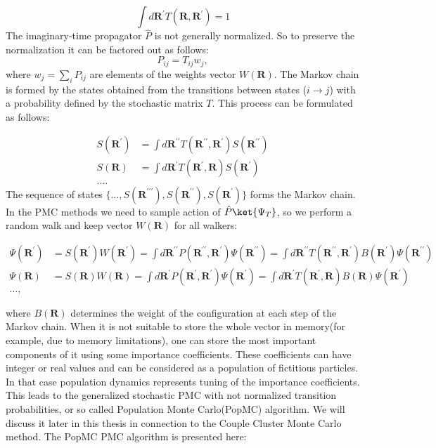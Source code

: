 \documentclass[twoside,english]{uiofysmaster}
\begin{document}
\begin{equation}
\int d\boldsymbol{R}^\prime T(\boldsymbol{R}, \boldsymbol{R}^\prime) = 1
\end{equation}
The imaginary-time propagator $\hat{P}$ is not generally normalized. So to preserve the normalization it can be factored out as follows:
\begin{equation}
P_{ij} = T_{ij}w_j,
\end{equation}
where $w_j = \sum_i P_{ij}$ are elements of the weights vector $W(\boldsymbol{R})$.
The Markov chain is formed by the states obtained from the transitions between states ($i \rightarrow j$) with a probability defined by the stochastic matrix $T$. This process can be formulated as follows:

\begin{align*}
S(\boldsymbol{R}^\prime)  &= \int d\boldsymbol{R}^{\prime\prime} T(\boldsymbol{R^{\prime\prime}}, \boldsymbol{R}^\prime) S(\boldsymbol{R}^{\prime\prime})\\
S(\boldsymbol{R}) &= \int d\boldsymbol{R}^\prime T(\boldsymbol{R^\prime}, \boldsymbol{R}) S(\boldsymbol{R}^{\prime})\\
\dots.
\end{align*}
The sequence of states $\{\dots ,S(\boldsymbol{R}^{\prime\prime\prime}) ,S(\boldsymbol{R}^{\prime\prime}), S(\boldsymbol{R}^\prime)\}$ forms the Markov chain. In the PMC methods we need to sample action of $\hat{P}\ket{\Psi_T}$, so we perform a random walk and keep vector $W(\boldsymbol{R})$ for all walkers:

\begin{align*}
\Psi(\boldsymbol{R}^\prime)  &= S(\boldsymbol{R}^{\prime})W(\boldsymbol{R}^{\prime}) = \int d\boldsymbol{R}^{\prime\prime} P(\boldsymbol{R^{\prime\prime}}, \boldsymbol{R}^\prime) \Psi(\boldsymbol{R}^{\prime\prime}) = \int d\boldsymbol{R}^{\prime\prime} T(\boldsymbol{R^{\prime\prime}}, \boldsymbol{R}^\prime) B(\boldsymbol{R}^{\prime}) \Psi(\boldsymbol{R}^{\prime\prime})\\
\Psi(\boldsymbol{R})  &= S(\boldsymbol{R})W(\boldsymbol{R}) = \int d\boldsymbol{R}^{\prime} P(\boldsymbol{R^{\prime}}, \boldsymbol{R}^\prime) \Psi(\boldsymbol{R}^{\prime}) = \int d\boldsymbol{R}^{\prime} T(\boldsymbol{R^{\prime}}, \boldsymbol{R}) B(\boldsymbol{R}) \Psi(\boldsymbol{R}^{\prime})\\
\dots ,
\end{align*}

where $B(\boldsymbol{R})$ determines the weight of the configuration at each step of the Markov chain. When it is not suitable to store the whole vector in memory(for example, due to memory limitations), one can store the most important components of it using some importance coefficients. These coefficients can have integer or real values and can be considered as a population of fictitious particles. In that case population dynamics represents tuning of the importance coefficients. This leads to the generalized stochastic PMC with not normalized transition probabilities, or so called Population Monte Carlo(PopMC) algorithm. We will discuss it later in this thesis in connection to the Couple Cluster Monte Carlo method. The PopMC PMC algorithm is presented here:
\end{document}

